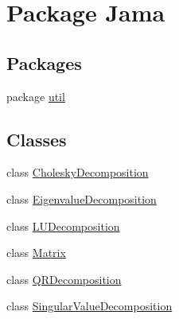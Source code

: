 \hypertarget{namespace_jama}{\section{Package Jama}
\label{namespace_jama}
}
\subsection*{Packages}
\begin{DoxyCompactItemize}
\item 
package \hyperlink{namespace_jama_1_1util}{util}
\end{DoxyCompactItemize}
\subsection*{Classes}
\begin{DoxyCompactItemize}
\item 
class \hyperlink{class_jama_1_1_cholesky_decomposition}{Cholesky\+Decomposition}
\item 
class \hyperlink{class_jama_1_1_eigenvalue_decomposition}{Eigenvalue\+Decomposition}
\item 
class \hyperlink{class_jama_1_1_l_u_decomposition}{L\+U\+Decomposition}
\item 
class \hyperlink{class_jama_1_1_matrix}{Matrix}
\item 
class \hyperlink{class_jama_1_1_q_r_decomposition}{Q\+R\+Decomposition}
\item 
class \hyperlink{class_jama_1_1_singular_value_decomposition}{Singular\+Value\+Decomposition}
\end{DoxyCompactItemize}
